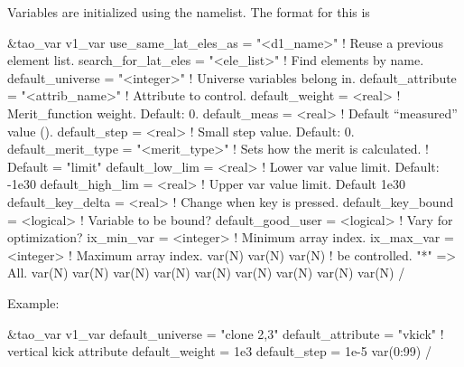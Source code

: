 {{{{{{{{{{{Variables are initialized using the  namelist. The format for this is
\begin{example}
  &tao_var
    v1_var%
    use_same_lat_eles_as = "<d1_name>"     ! Reuse a previous element list.
    search_for_lat_eles  = "<ele_list>"    ! Find elements by name.
    default_universe     = "<integer>"     ! Universe variables belong in.
    default_attribute    = "<attrib_name>" ! Attribute to control.
    default_weight       = <real>          ! Merit_function weight. Default: 0.
    default_meas         = <real>          ! Default ``measured'' value ().
    default_step         = <real>          ! Small step value. Default: 0.
    default_merit_type   = "<merit_type>"  ! Sets how the merit is calculated.
                                           !   Default = "limit"
    default_low_lim      = <real>          ! Lower var value limit. Default: -1e30
    default_high_lim     = <real>          ! Upper var value limit. Default 1e30
    default_key_delta    = <real>          ! Change when key is pressed.
    default_key_bound    = <logical>       ! Variable  to be bound?
    default_good_user    = <logical>       ! Vary for optimization?
    ix_min_var           = <integer>       ! Minimum array index.
    ix_max_var           = <integer>       ! Maximum array index.
    var(N)%
    var(N)%
    var(N)%
                                           !    be controlled. "*" => All.
    var(N)%
    var(N)%
    var(N)%
    var(N)%
    var(N)%
    var(N)%
    var(N)%
    var(N)%
    var(N)%
  /
\end{example}
Example:
\begin{example}
  &tao_var
    v1_var%
    default_universe  = "clone 2,3"
    default_attribute = "vkick"     ! vertical kick attribute
    default_weight    = 1e3
    default_step      = 1e-5
    var(0:99)%
  /
\end{example}

}}}}}}}}}}}
